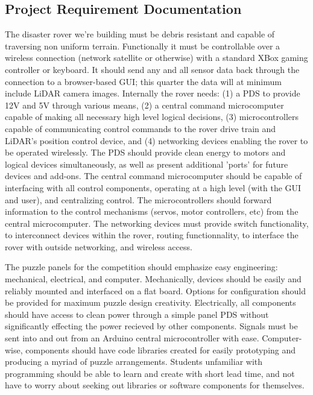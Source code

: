 \documentclass[a4paper, 10pt]{article}
\begin{document}
\pagebreak

	\subsection*{Project Requirement Documentation}
	The disaster rover we're building must be debris resistant and capable of traversing non uniform terrain. Functionally it must be controllable over a wireless connection (network satellite or otherwise) with a standard XBox gaming controller or keyboard. It should send any and all sensor data back through the connection to a browser-based GUI; this quarter the data will at minimum include LiDAR camera images. Internally the rover needs: (1) a PDS to provide 12V and 5V through various means, (2) a central command microcomputer capable of making all necessary high level logical decisions, (3) microcontrollers capable of communicating control commands to the rover drive train and LiDAR's position control device, and (4) networking devices enabling the rover to be operated wirelessly. The PDS should provide clean energy to motors and logical devices simultaneously, as well as present additional 'ports' for future devices and add-ons. The central command microcomputer should be capable of interfacing with all control components, operating at a high level (with the GUI and user), and centralizing control. The microcontrollers should forward information to the control mechanisms (servos, motor controllers, etc) from the central microcomputer. The networking devices must provide switch functionality, to interconnect devices within the rover, routing functionnality, to interface the rover with outside networking, and wireless access.
	
	The puzzle panels for the competition should emphasize easy engineering: mechanical, electrical, and computer. Mechanically, devices should be easily and reliably mounted and interfaced on a flat board. Options for configuration should be provided for maximum puzzle design creativity. Electrically, all components should have access to clean power through a simple panel PDS without significantly effecting the power recieved by other components. Signals must be sent into and out from an Arduino central microcontroller with ease. Computer-wise, components should have code libraries created for easily prototyping and producing a myriad of puzzle arrangements. Students unfamiliar with programming should be able to learn and create with short lead time, and not have to worry about seeking out libraries or software components for themselves. 
	
\end{document}
